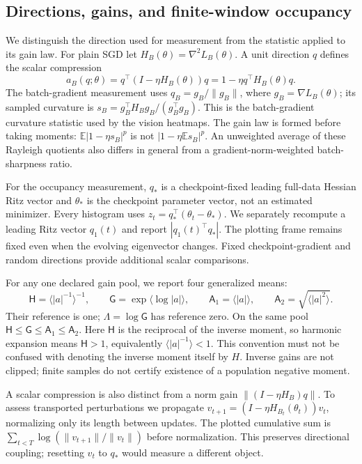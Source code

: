 \subsection{Directions, gains, and finite-window occupancy}
We distinguish the direction used for measurement from the statistic applied to its gain law. For plain SGD let $H_B(\theta)=\nabla^2 L_B(\theta)$. A unit direction $q$ defines the scalar compression
\begin{equation}
 a_B(q;\theta)=q^\top(I-\eta H_B(\theta))q=1-\eta q^\top H_B(\theta)q.
\end{equation}
The batch-gradient measurement uses $q_B=g_B/\|g_B\|$, where $g_B=\nabla L_B(\theta)$; its sampled curvature is $s_B=g_B^\top H_Bg_B/(g_B^\top g_B)$. This is the batch-gradient curvature statistic used by the vision heatmaps. The gain law is formed before taking moments: $\mathbb E|1-\eta s_B|^p$ is not $|1-\eta\mathbb E s_B|^p$. An unweighted average of these Rayleigh quotients also differs in general from a gradient-norm-weighted batch-sharpness ratio.

For the occupancy measurement, $q_*$ is a checkpoint-fixed leading full-data Hessian Ritz vector and $\theta_*$ is the checkpoint parameter vector, not an estimated minimizer. Every histogram uses $z_t=q_*^\top(\theta_t-\theta_*)$. We separately recompute a leading Ritz vector $q_1(t)$ and report $|q_1(t)^\top q_*|$. The plotting frame remains fixed even when the evolving eigenvector changes. Fixed checkpoint-gradient and random directions provide additional scalar comparisons.

For any one declared gain pool, we report four generalized means:
\begin{equation}
 \mathsf H=\bigl\langle |a|^{-1}\bigr\rangle^{-1},\qquad
 \mathsf G=\exp\langle\log|a|\rangle,\qquad
 \mathsf A_1=\langle|a|\rangle,\qquad
 \mathsf A_2=\sqrt{\langle|a|^2\rangle}.
\end{equation}
Their reference is one; $\Lambda=\log\mathsf G$ has reference zero. On the same pool $\mathsf H\leq\mathsf G\leq\mathsf A_1\leq\mathsf A_2$. Here $\mathsf H$ is the reciprocal of the inverse moment, so harmonic expansion means $\mathsf H>1$, equivalently $\langle|a|^{-1}\rangle<1$. This convention must not be confused with denoting the inverse moment itself by $H$. Inverse gains are not clipped; finite samples do not certify existence of a population negative moment.

A scalar compression is also distinct from a norm gain $\|(I-\eta H_B)q\|$. To assess transported perturbations we propagate $v_{t+1}=(I-\eta H_{B_t}(\theta_t))v_t$, normalizing only its length between updates. The plotted cumulative sum is $\sum_{t<T}\log(\|v_{t+1}\|/\|v_t\|)$ before normalization. This preserves directional coupling; resetting $v_t$ to $q_*$ would measure a different object.

